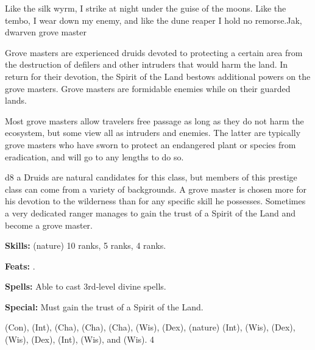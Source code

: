 {Like the silk wyrm, I strike at night under the guise of the moons. Like the tembo, I wear down my enemy, and like the dune reaper I hold no remorse.}{Jak, dwarven grove master}
{Grove masters are experienced druids devoted to protecting a certain area from the destruction of defilers and other intruders that would harm the land. In return for their devotion, the Spirit of the Land bestows additional powers on the grove masters. Grove masters are formidable enemies while on their guarded lands.

Most grove masters allow travelers free passage as long as they do not harm the ecosystem, but some view all as intruders and enemies. The latter are typically grove masters who have sworn to protect an endangered plant or species from eradication, and will go to any lengths to do so.}
{d8}
{a}
{Druids are natural candidates for this class, but members of this prestige class can come from a variety of backgrounds. A grove master is chosen more for his devotion to the wilderness than for any specific skill he possesses. Sometimes a very dedicated ranger manages to gain the trust of a Spirit of the Land and become a grove master.}
{
\textbf{Skills:}  (nature) 10 ranks,  5 ranks,  4 ranks.

\textbf{Feats:} .

\textbf{Spells:} Able to cast 3rd‐level divine spells.

\textbf{Special:} Must gain the trust of a Spirit of the Land.
}
{ (Con),  (Int),  (Cha),  (Cha),  (Cha),  (Wis),  (Dex),  (nature) (Int),  (Wis),  (Dex),  (Wis),  (Dex),  (Int),  (Wis), and  (Wis).
}
{4}
